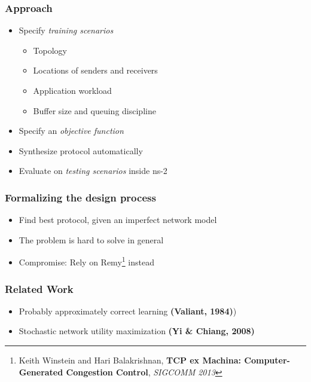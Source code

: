 \documentclass[svgnames]{beamer}
\begin{document}
\begin{Large}
\begin{frame}
\frametitle{Approach}
\begin{itemize}
\item Specify \textit{training scenarios}
\begin{itemize}
\item Topology
\item Locations of senders and receivers
\item Application workload
\item Buffer size and queuing discipline 
\end{itemize}
\item Specify an \textit{objective function}
\item Synthesize protocol automatically
\item Evaluate on \textit{testing scenarios} inside ns-2
\end{itemize}
\end{frame}

\begin{frame}
\frametitle{Formalizing the design process}
\begin{itemize}
\item Find best protocol, given an imperfect network model
\item The problem is hard to solve in general
\item<2-> Compromise: Rely on Remy\footnote<2->{Keith Winstein and Hari Balakrishnan, \textbf{TCP ex Machina: Computer-Generated Congestion Control}, \textit{SIGCOMM 2013}} instead
\end{itemize}
\end{frame}

%











\begin{frame}
\frametitle{Related Work}
\begin{itemize}
\item Probably approximately correct learning \textbf{(Valiant, 1984)})
\item Stochastic network utility maximization \textbf{(Yi \& Chiang, 2008)}
\end{itemize}
\end{frame}


\end{Large}
\end{document}

